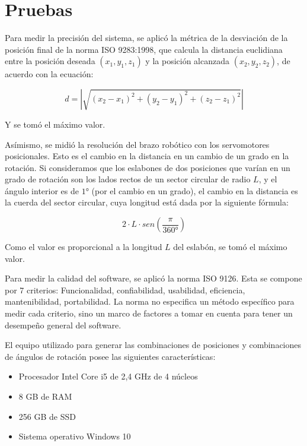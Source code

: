 \section{Pruebas}

Para medir la precisión del sistema, se aplicó la métrica de la desviación de la posición final de la norma ISO 9283:1998, que calcula la distancia euclidiana entre la posición deseada $(x_1, y_1, z_1)$ y la posición alcanzada $(x_2, y_2, z_2)$, de acuerdo con la ecuación:

\begin{equation}
	d = |\sqrt{(x_2 - x_1)^2 + (y_2 - y_1)^2 + (z_2 - z_1)^2}|
\end{equation}

Y se tomó el máximo valor.

Asímismo, se midió la resolución del brazo robótico con los servomotores posicionales. Esto es el cambio en la distancia en un cambio de un grado en la rotación. Si consideramos que los eslabones de dos posiciones que varían en un grado de rotación son los lados rectos de un sector circular de radio $L$, y el ángulo interior es de $1°$ (por el cambio en un grado), el cambio en la distancia es la cuerda del sector circular, cuya longitud está dada por la siguiente fórmula:

\begin{equation}
	2 \cdot L \cdot sen(\frac{\pi}{360°})
\end{equation}

Como el valor es proporcional a la longitud $L$ del eslabón, se tomó el máximo valor. 

Para medir la calidad del software, se aplicó la norma ISO 9126. Esta se compone por 7 criterios: Funcionalidad, confiabilidad, usabilidad, eficiencia, mantenibilidad, portabilidad. La norma no especifica un método específico para medir cada criterio, sino un marco de factores a tomar en cuenta para tener un desempeño general del software. 

El equipo utilizado para generar las combinaciones de posiciones y combinaciones de ángulos de rotación posee las siguientes características:

\begin{itemize}
	\item Procesador Intel Core i5 de 2,4 GHz de 4 núcleos
	\item 8 GB de RAM
	\item 256 GB de SSD
	\item Sistema operativo Windows 10
\end{itemize}